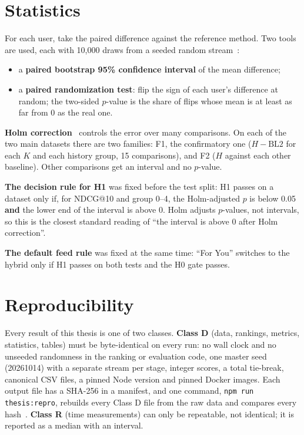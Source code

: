 \section{Statistics}
\label{sec:method-stats}

For each user, take the paired difference against the reference method. Two tools are used, each with 10,000 draws from a seeded random stream~:
\begin{itemize}
  \item a \textbf{paired bootstrap 95\% confidence interval} of the mean difference;
  \item a \textbf{paired randomization test}: flip the sign of each user's difference at random; the two-sided $p$-value is the share of flips whose mean is at least as far from 0 as the real one.
\end{itemize}

\textbf{Holm correction}~ controls the error over many comparisons. On each of the two main datasets there are two families: F1, the confirmatory one ($H - \text{BL2}$ for each $K$ and each history group, 15 comparisons), and F2 ($H$ against each other baseline). Other comparisons get an interval and no $p$-value.

\textbf{The decision rule for H1} was fixed before the test split: H1 passes on a dataset only if, for NDCG@10 and group 0--4, the Holm-adjusted $p$ is below 0.05 \textbf{and} the lower end of the interval is above 0. Holm adjusts $p$-values, not intervals, so this is the closest standard reading of ``the interval is above 0 after Holm correction''.

\textbf{The default feed rule} was fixed at the same time: ``For You'' switches to the hybrid only if H1 passes on both tests and the H0 gate passes.

\section{Reproducibility}
\label{sec:method-repro}

Every result of this thesis is one of two classes. \textbf{Class D} (data, rankings, metrics, statistics, tables) must be byte-identical on every run: no wall clock and no unseeded randomness in the ranking or evaluation code, one master seed (20261014) with a separate stream per stage, integer scores, a total tie-break, canonical CSV files, a pinned Node version and pinned Docker images. Each output file has a SHA-256 in a manifest, and one command, \texttt{npm run thesis:repro}, rebuilds every Class D file from the raw data and compares every hash~. \textbf{Class R} (time measurements) can only be repeatable, not identical; it is reported as a median with an interval.

